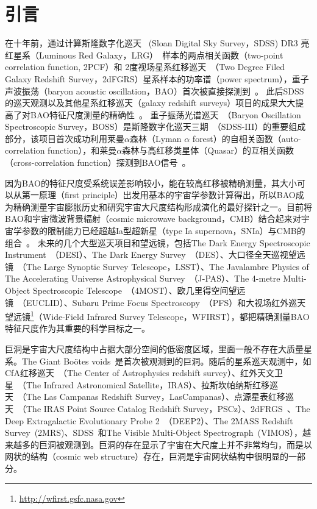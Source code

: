 \chapter{引言}
\label{cha:intro}

在十年前，通过计算斯隆数字化巡天~\cite{York2000} (Sloan Digital Sky Survey，SDSS) DR3 亮红星系（Luminous Red Galaxy，LRG）~\cite{Eisenstein2001}样本的两点相关函数（two-point correlation function, 2PCF）和 2度视场星系红移巡天~\cite{Colless2001}（Two Degree Filed Galaxy Redshift Survey，2dFGRS）星系样本的功率谱（power spectrum），重子声波振荡（baryon acoustic oscillation，BAO）首次被直接探测到~\cite{Eisenstein2005,Cole2005}。
此后SDSS的巡天观测以及其他星系红移巡天（galaxy redshift surveys）项目的成果大大提高了对BAO特征尺度测量的精确性~\cite{Percival2010,Blake2011,Beutler2011,Drinkwater2010,White2011,Eisenstein2011,Dawson2013,Anderson2014441,Ross2015}。
重子振荡光谱巡天~\cite{Dawson2013}（Baryon Oscillation Spectroscopic Survey，BOSS）是斯隆数字化巡天三期~\cite{Eisenstein2011}（SDSS-III）的重要组成部分，该项目首次成功利用莱曼$\alpha$森林（Lyman $\alpha$ forest）的自相关函数（auto-correlation function），和莱曼$\alpha$森林与高红移类星体（Quasar）的互相关函数（cross-correlation function）探测到BAO信号~\cite{Busca2013,Slosar2013,Font-Ribera2014,Delubac2015}。

因为BAO的特征尺度受系统误差影响较小，能在较高红移被精确测量，其大小可以从第一原理（first principle）出发用基本的宇宙学参数计算得出，所以BAO成为精确测量宇宙膨胀历史和研究宇宙大尺度结构形成演化的最好探针之一。目前将BAO和宇宙微波背景辐射（cosmic microwave background，CMB）结合起来对宇宙学参数的限制能力已经超越Ia型超新星（type Ia supernova，SNIa）与CMB的组合~\cite{ABB14}。
未来的几个大型巡天项目和望远镜，包括The Dark Energy Spectroscopic Instrument~\cite{bigboss2011}（DESI）、The Dark Energy Survey~\cite{des2013}（DES）、大口径全天巡视望远镜~\cite{lsst2012}（The Large Synoptic Survey Telescope，LSST）、The Javalambre Physics of The Accelerating Universe Astrophysical Survey~\cite{jpas2014}（J-PAS）、The 4-metre Multi-Object Spectroscopic Telescope~\cite{4most}（4MOST）、欧几里得空间望远镜~\cite{euclid2009}（EUCLID）、Subaru Prime Focus Spectroscopy~\cite{Tamura2016}（PFS）和大视场红外巡天望远镜\footnote{\url{http://wfirst.gsfc.nasa.gov}}（Wide-Field Infrared Survey Telescope，WFIRST），都把精确测量BAO特征尺度作为其重要的科学目标之一。

巨洞是宇宙大尺度结构中占据大部分空间的低密度区域，里面一般不存在大质量星系。The Giant Bo\"otes voids~\cite{KOS81}是首次被观测到的巨洞。随后的星系巡天观测中，如CfA红移巡天~\cite{LGH86,VGP94}（The Center of Astrophysics redshift survey）、红外天文卫星~\cite{EP97}（The Infrared Astronomical Satellite，IRAS）、拉斯坎帕纳斯红移巡天~\cite{MAE00}（The Las Campanas Redshift Survey，LasCampanas）、点源星表红移巡天~\cite{PB02}（The IRAS Point Source Catalog Redshift Survey，PSCz）、2dFRGS~\cite{CCG04,HV04,Patiri2006HB}、The Deep Extragalactic Evolutionary Probe 2~\cite{CCW05}（DEEP2）、The 2MASS Redshift Survey~\cite{NKH14}(2MRS)、SDSS~\cite{Platen2011,VBT12,PVH12,NH14,SLW14,BKH15}和The Visible Multi-Object Spectrograph~\cite{Micheletti02014}(VIMOS），越来越多的巨洞被观测到。巨洞的存在显示了宇宙在大尺度上并不非常均匀，而是以网状的结构（cosmic web structure）存在，巨洞是宇宙网状结构中很明显的一部分。

